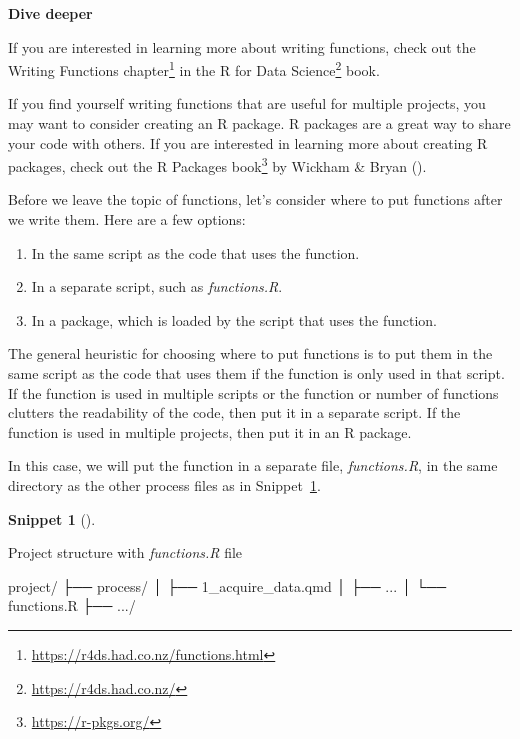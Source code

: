 \documentclass[
  letterpaper,
  krantz1]{latex/krantz-mod}
\newenvironment{Shaded}{\begin{snugshade}}{\end{snugshade}}
\newcommand{\ExtensionTok}[1]{\textcolor[rgb]{0.00,0.00,0.00}{#1}}
\newcommand{\NormalTok}[1]{\textcolor[rgb]{0.00,0.00,0.00}{#1}}
\providecommand{\tightlist}{%
  \setlength{\itemsep}{0pt}\setlength{\parskip}{0pt}}\usepackage{longtable,booktabs,array}
\theoremstyle{definition}
\newtheorem{definition}{Snippet}[chapter]
\theoremstyle{definition}
\theoremstyle{remark}
\DeclareRobustCommand{\href}[2]{#2\footnote{\url{#1}}}
\begin{document}
\begin{tcolorbox}[enhanced jigsaw, toprule=.15mm, breakable, colback=white, arc=.35mm, left=2mm, colframe=quarto-callout-color-frame, opacityback=0, bottomrule=.15mm, rightrule=.15mm, leftrule=.75mm]

\textbf{ Dive deeper}

If you are interested in learning more about writing functions, check
out the \href{https://r4ds.had.co.nz/functions.html}{Writing Functions
chapter} in the \href{https://r4ds.had.co.nz/}{R for Data Science} book.

If you find yourself writing functions that are useful for multiple
projects, you may want to consider creating an R package. R packages are
a great way to share your code with others. If you are interested in
learning more about creating R packages, check out the
\href{https://r-pkgs.org/}{R Packages book} by Wickham \& Bryan
().

\end{tcolorbox}

Before we leave the topic of functions, let's consider where to put
functions after we write them. Here are a few options:

\begin{enumerate}
\def\labelenumi{\arabic{enumi}.}
\tightlist
\item
  In the same script as the code that uses the function.
\item
  In a separate script, such as \emph{functions.R}.
\item
  In a package, which is loaded by the script that uses the function.
\end{enumerate}

The general heuristic for choosing where to put functions is to put them
in the same script as the code that uses them if the function is only
used in that script. If the function is used in multiple scripts or the
function or number of functions clutters the readability of the code,
then put it in a separate script. If the function is used in multiple
projects, then put it in an R package.

In this case, we will put the function in a separate file,
\emph{functions.R}, in the same directory as the other process files as
in Snippet~\ref{def-acquire-functions-r}.

\begin{definition}[]\protect\hypertarget{def-acquire-functions-r}{}\label{def-acquire-functions-r}

Project structure with \emph{functions.R} file

\begin{Shaded}
\begin{Highlighting}[]
\ExtensionTok{project/}
\ExtensionTok{├──}\NormalTok{ process/}
\ExtensionTok{│}\NormalTok{   ├── 1\_acquire\_data.qmd}
\ExtensionTok{│}\NormalTok{   ├── ...}
\ExtensionTok{│}\NormalTok{   └── functions.R}
\ExtensionTok{├──}\NormalTok{ .../}
\end{Highlighting}
\end{Shaded}

\end{definition}
\end{document}
